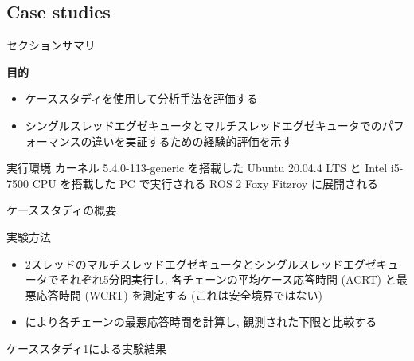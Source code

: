 \subsection{Case studies}
\label{ssec: case studies}

\begin{frame}{セクションサマリ}
    \begin{itembox}[l]{\textbf{目的}}
        \begin{itemize}
            \item ケーススタディを使用して分析手法を評価する
            \item シングルスレッドエグゼキュータとマルチスレッドエグゼキュータでのパフォーマンスの違いを実証するための経験的評価を示す
        \end{itemize}
    \end{itembox}
\end{frame}

\begin{frame}{実行環境}
    カーネル 5.4.0-113-generic を搭載した Ubuntu 20.04.4 LTS と Intel i5-7500 CPU を搭載した PC で実行される ROS 2 Foxy Fitzroy に展開される
\end{frame}


\begin{frame}{ケーススタディの概要}
\end{frame}

\begin{frame}{実験方法}
    \begin{itemize}
        \item 2スレッドのマルチスレッドエグゼキュータとシングルスレッドエグゼキュータでそれぞれ5分間実行し, 各チェーンの平均ケース応答時間 (ACRT) と最悪応答時間 (WCRT) を測定する (これは安全境界ではない) 
        \item {} により各チェーンの最悪応答時間を計算し, 観測された下限と比較する
    \end{itemize}
\end{frame}


\begin{frame}{ケーススタディ1による実験結果}
\end{frame}

